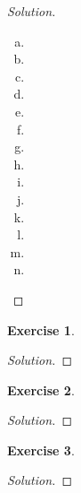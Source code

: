 \documentclass[12pt,a4]{article}
\theoremstyle{definition}
\newtheorem{exercise}{Exercise}
\begin{document}
\begin{proof}[Solution]
	\begin{enumerate}[(a)]
		\item 
		
		\item 
		
		\item 
		
		\item 
		
		\item 
		
		\item 
		
		\item 
		
		\item 
		
		\item 
		
		\item 
		
		\item 
		
		\item 
		
		\item 
		
		\item 
	\end{enumerate}
\end{proof}

\begin{exercise}
	 
\end{exercise}
\begin{proof}[Solution]
	
\end{proof}

\begin{exercise}
	
\end{exercise}
\begin{proof}[Solution]
	
\end{proof}

\begin{exercise}
	
\end{exercise}
\begin{proof}[Solution]
	
\end{proof}
\end{document}
